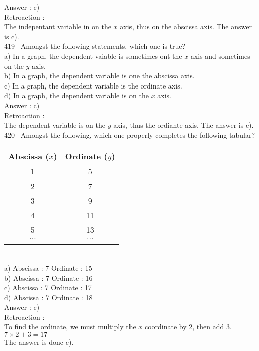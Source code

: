 ﻿\documentclass[letterpaper, 12pt]{article}
\begin{document}
Answer : c)\\

Retroaction :\\
The indepentant variable in on the $x$ axis, thus on the abscissa axis. The answer is c).\\

419-- Amongst the following statements, which one is true?\\
a) In a graph, the dependent vaiable is sometimes ont the $x$ axis and sometimes on the $y$ axis.  \\
b) In a graph, the dependent variable is one the abscissa axis.\\
c) In a graph, the dependent variable is the ordinate axis.\\
d) In a graph, the dependent variable is on the $x$ axis.\\

Answer : c)\\

Retroaction :\\
The dependent variable is on the $y$ axis, thus the ordiante axis.  The answer is c).\\


420-- Amongst the following, which one properly completes the following tabular?\\
\begin{tabular}{|c|c|} \hline
{\bf Abscissa ($x$)} & {\bf Ordinate ($y$)}  \\ \hline \hline

1 & 5 \\ \hline
2 & 7 \\ \hline
3 & 9 \\ \hline
4 & 11 \\ \hline
5 & 13 \\ \hline
$\ldots$ & $\ldots$ \\ \hline
\multicolumn{2}{c}{}\\
\end{tabular}\\
a) Abscissa : 7 \qquad Ordinate : 15\\
b) Abscissa : 7 \qquad Ordinate : 16\\
c) Abscissa : 7 \qquad Ordinate : 17\\
d) Abscissa : 7 \qquad Ordinate : 18\\

Answer : c)\\

Retroaction :\\
To find the ordinate, we must multiply the $x$ coordinate by 2,
then add 3.  \\
$7\times2+3=17$\\
The answer is donc c).\\
\end{document}

